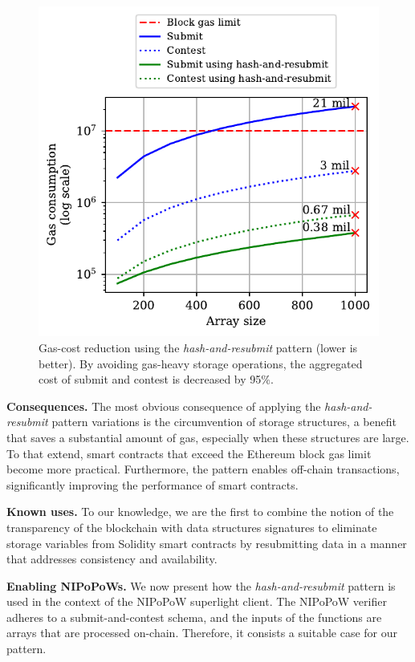 \begin{figure}[h!]
\begin{center}
\includegraphics[width=1 \columnwidth]{figures/har-example.pdf}
\end{center}
\caption{Gas-cost reduction using the \emph{hash-and-resubmit} pattern (lower
is better). By avoiding gas-heavy storage operations, the aggregated cost of
\textsf{submit} and \textsf{contest} is decreased by 95\%.}
\label{fig:har-example}
\end{figure}

\noindent \textbf{Consequences.} The most obvious consequence of applying the
\emph{hash-and-resubmit} pattern variations is the circumvention of storage
structures, a benefit that saves a substantial amount of gas, especially when
these structures are large. To that extend, smart contracts that exceed the
Ethereum block gas limit become more practical. Furthermore, the pattern
enables off-chain transactions, significantly improving the performance of
smart contracts.

\noindent \textbf{Known uses.} To our knowledge, we are the first to combine
the notion of the transparency of the blockchain with data structures
signatures to eliminate storage variables from Solidity smart contracts by
resubmitting data in a manner that addresses consistency and availability.

\noindent \textbf{Enabling NIPoPoWs.} We now present how the
\emph{hash-and-resubmit} pattern is used in the context of the NIPoPoW
superlight client. The NIPoPoW verifier adheres to a submit-and-contest
schema, and the inputs of the functions are arrays that are processed on-chain.
Therefore, it consists a suitable case for our pattern.

